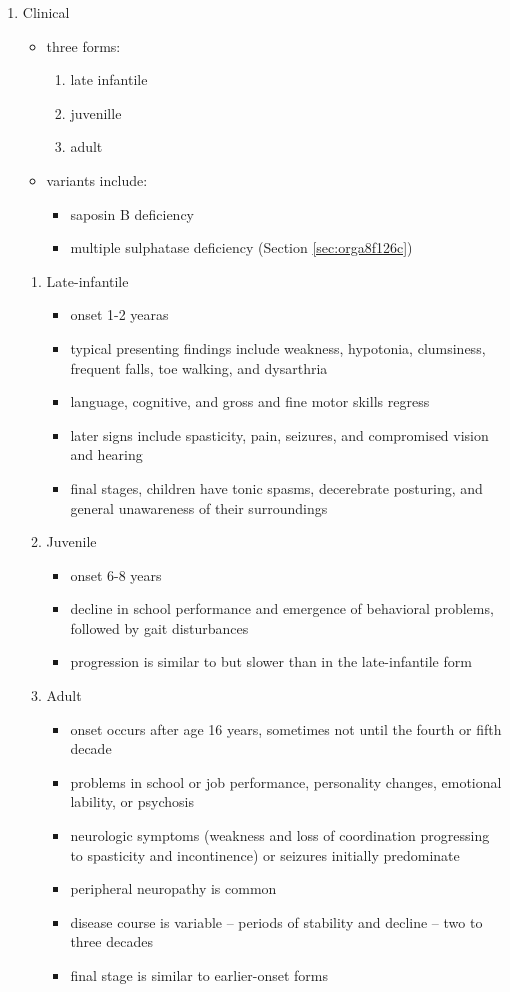 \documentclass{scrartcl}
\begin{document}
\begin{enumerate}
\item Clinical
\label{sec:org4afbbf7}
\begin{itemize}
\item three forms:
\begin{enumerate}
\item late infantile
\item juvenille
\item adult
\end{enumerate}
\item variants include:
\begin{itemize}
\item saposin B deficiency
\item multiple sulphatase deficiency (Section \ref{sec:orga8f126c})
\end{itemize}
\end{itemize}
\begin{enumerate}
\item Late-infantile
\label{sec:org2a7bc10}
\begin{itemize}
\item onset 1-2 yearas
\item typical presenting findings include weakness, hypotonia, clumsiness, frequent falls, toe walking, and dysarthria
\item language, cognitive, and gross and fine motor skills regress
\item later signs include spasticity, pain, seizures, and compromised vision and hearing
\item final stages, children have tonic spasms, decerebrate posturing, and
general unawareness of their surroundings
\end{itemize}

\item Juvenile
\label{sec:org79426ed}
\begin{itemize}
\item onset 6-8 years
\item decline in school performance and emergence of behavioral problems, followed by gait disturbances
\item progression is similar to but slower than in the late-infantile form
\end{itemize}

\item Adult
\label{sec:orgad088c2}
\begin{itemize}
\item onset occurs after age 16 years, sometimes not until the fourth or fifth decade
\item problems in school or job performance, personality changes, emotional lability, or psychosis
\item neurologic symptoms (weakness and loss of coordination progressing
to spasticity and incontinence) or seizures initially
predominate
\item peripheral neuropathy is common
\item disease course is variable – periods of stability and decline – two to three decades
\item final stage is similar to earlier-onset forms
\end{itemize}
\end{enumerate}


\end{enumerate}
\end{document}
